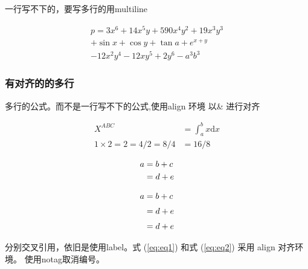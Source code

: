 \documentclass[utf-8,a4paper,11pt]{article}
\begin{document}
一行写不下的，要写多行的用multiline
\begin{LTXexample}
    \begin{multline}
        p = 3x^6 + 14x^5y + 590x^4y^2 + 19x^3y^3\\
        + \sin{x} + \cos{y} + \tan{a} + e^{x+y} \\
        - 12x^2y^4 - 12xy^5 + 2y^6 - a^3b^3
    \end{multline}
\end{LTXexample}

\subsubsection{有对齐的的多行}

多行的公式。而不是一行写不下的公式,使用align 环境 以\& 进行对齐
\begin{LTXexample}
\begin{align*}
    X^{ABC}& = \int_a^b x \mathrm{d}x \\
    1\times 2=2=4/2=8/4 & =16/8
\end{align*}

\begin{align}
    a & = b + c\\
      & = d + e \notag
\end{align}
\end{LTXexample}

\begin{align}
    a & = b + c \label{eq:eq1}
    \\[3pt]
      & = d + e  \label{eq:eq2}
    \\[3pt]
      & = d + e \notag
\end{align}

分别交叉引用，依旧是使用label。式 (\ref{eq:eq1}) 和式 (\ref{eq:eq2}) 采用 align 对齐环境。 使用notag取消编号。







\end{document}
